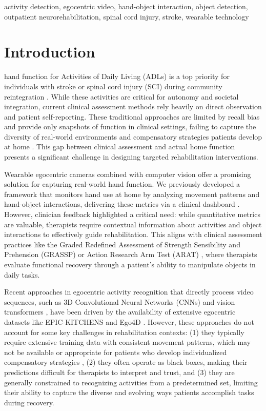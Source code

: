 \documentclass[journal,twoside,web]{ieeecolor}
\begin{document}
\begin{IEEEkeywords}
activity detection, egocentric video, hand-object interaction, object detection, outpatient neurorehabilitation, spinal cord injury, stroke, wearable technology
\end{IEEEkeywords}

\section{Introduction}
 hand function for Activities of Daily Living (ADLs) is a top priority for individuals with stroke or spinal cord injury (SCI) during community reintegration \cite{Anderson2004-ck, Purton2023-ad}. While these activities are critical for autonomy and societal integration, current clinical assessment methods rely heavily on direct observation and patient self-reporting. These traditional approaches are limited by recall bias and provide only snapshots of function in clinical settings, failing to capture the diversity of real-world environments and compensatory strategies patients develop at home \cite{Adams1999-ie}. This gap between clinical assessment and actual home function presents a significant challenge in designing targeted rehabilitation interventions.

Wearable egocentric cameras combined with computer vision offer a promising solution for capturing real-world hand function. We previously developed a framework \cite{Bandini2022-rs} that monitors hand use at home by analyzing movement patterns and hand-object interactions, delivering these metrics via a clinical dashboard \cite{Kadambi2023-iv}. However, clinician feedback highlighted a critical need: while quantitative metrics are valuable, therapists require contextual information about activities and object interactions to effectively guide rehabilitation. This aligns with clinical assessment practices like the Graded Redefined Assessment of Strength Sensibility and Prehension (GRASSP) \cite{Kalsi-Ryan2012-pr} or Action Research Arm Test (ARAT) \cite{Yozbatiran2008-ac}, where therapists evaluate functional recovery through a patient's ability to manipulate objects in daily tasks.

Recent approaches in egocentric activity recognition that directly process video sequences, such as 3D Convolutional Neural Networks (CNNs) \cite{Carreira2017-iz, Feichtenhofer2018-ac} and vision transformers \cite{Bertasius2021-re} \cite{Liu2021-tq}, have been driven by the availability of extensive egocentric datasets like EPIC-KITCHENS \cite{Damen2020-ep} and Ego4D \cite{Grauman2021-pg}. However, these approaches do not account for some key challenges in rehabilitation contexts: (1) they typically require extensive training data with consistent movement patterns, which may not be available or appropriate for patients who develop individualized compensatory strategies \cite{Jones2017-zu}, (2) they often operate as black boxes, making their predictions difficult for therapists to interpret and trust, and (3) they are generally constrained to recognizing activities from a predetermined set, limiting their ability to capture the diverse and evolving ways patients accomplish tasks during recovery.
\end{document}
